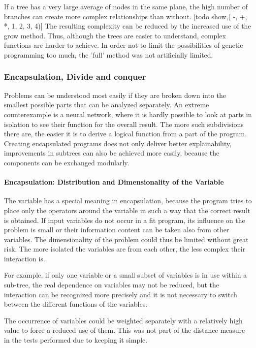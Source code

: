 If a tree has a very large average of nodes in the same plane, the high number of branches can create more complex relationships than without. [todo show,( -, +, *, 1, 2, 3, 4)] The resulting complexity can be reduced by the increased use of the grow method. Thus, although the trees are easier to understand, complex functions are harder to achieve. In order not to limit the possibilities of genetic programming too much, the 'full' method was not artificially limited.

\subsubsection{Encapsulation, Divide and conquer}
Problems can be understood most easily if they are broken down into the smallest possible parts that can be analyzed separately. An extreme counterexample is a neural network, where it is hardly possible to look at parts in isolation to see their function for the overall result. The more such subdivisions there are, the easier it is to derive a logical function from a part of the program. Creating encapsulated programs does not only deliver better explainability, improvements in subtrees can also be achieved more easily, because the components can be exchanged modularly.

\paragraph{Encapsulation: Distribution and Dimensionality of the Variable}

The variable has a special meaning in encapsulation, because the program tries to place only the operators around the variable in such a way that the correct result is obtained.
If input variables do not occur in a fit program, its influence on the problem is small or their information content can be taken also from other variables. The dimensionality of the problem could thus be limited without great risk. The more isolated the variables are from each other, the less complex their interaction is.

For example, if only one variable or a small subset of variables is in use within a sub-tree, the real dependence on variables may not be reduced, but the interaction can be recognized more precisely and it is not necessary to switch between the different functions of the variables.

The occurrence of variables could be weighted separately with a relatively high value to force a reduced use of them. This was not part of the distance measure in the tests performed due to keeping it simple.

